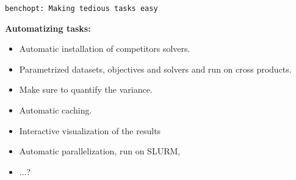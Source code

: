 \documentclass{beamer}
\begin{document}
\begin{frame}{\texttt{benchopt: Making tedious tasks easy}}

    {\bf Automatizing tasks:}\\[1.2em]
    \begin{itemize}\itemsep.7em
        \item Automatic installation of competitors solvers.
        \item Parametrized datasets, objectives and solvers and run on cross products.
        \item Make sure to quantify the variance.
        \item Automatic caching.
        \item Interactive visualization of the results
        \item Automatic parallelization, run on SLURM,
        \item ...?
    \end{itemize}
\end{frame}
\end{document}
